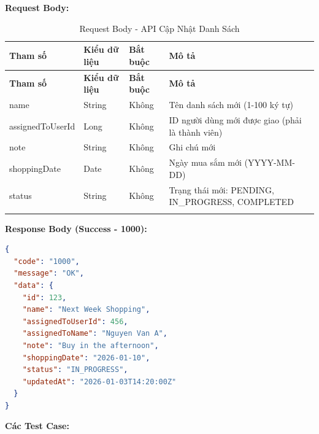 \textbf{Request Body:}

\small
\begin{longtable}{|>{\raggedright\arraybackslash}p{3.5cm}|>{\raggedright\arraybackslash}p{2.5cm}|>{\raggedright\arraybackslash}p{2cm}|>{\raggedright\arraybackslash}p{5.5cm}|}
\hline
\textbf{Tham số} & \textbf{Kiểu dữ liệu} & \textbf{Bắt buộc} & \textbf{Mô tả} \\
\hline
\endfirsthead
\hline
\textbf{Tham số} & \textbf{Kiểu dữ liệu} & \textbf{Bắt buộc} & \textbf{Mô tả} \\
\hline
\endhead
name & String & Không & Tên danh sách mới (1-100 ký tự) \\
\hline
assignedToUserId & Long & Không & ID người dùng mới được giao (phải là thành viên) \\
\hline
note & String & Không & Ghi chú mới \\
\hline
shoppingDate & Date & Không & Ngày mua sắm mới (YYYY-MM-DD) \\
\hline
status & String & Không & Trạng thái mới: PENDING, IN\_PROGRESS, COMPLETED \\
\hline
\caption{Request Body - API Cập Nhật Danh Sách}
\end{longtable}

\textbf{Response Body (Success - 1000):}

\begin{lstlisting}[language=json, caption=Response thanh cong API 1.5]
{
  "code": "1000",
  "message": "OK",
  "data": {
    "id": 123,
    "name": "Next Week Shopping",
    "assignedToUserId": 456,
    "assignedToName": "Nguyen Van A",
    "note": "Buy in the afternoon",
    "shoppingDate": "2026-01-10",
    "status": "IN_PROGRESS",
    "updatedAt": "2026-01-03T14:20:00Z"
  }
}
\end{lstlisting}

\textbf{Các Test Case:}

